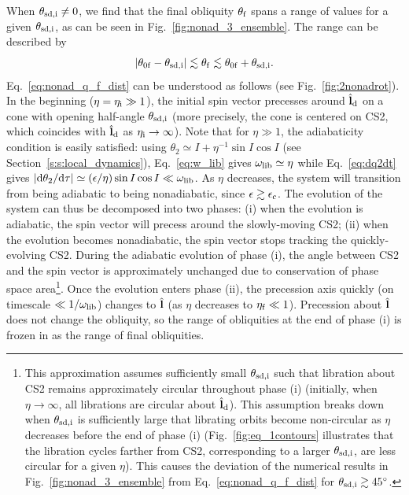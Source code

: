 When $\theta_{\rm sd, i}\neq 0$, we find that the final obliquity $\theta_{\rm
f}$ spans a range of values for a given $\theta_{\rm sd, i}$, as can be
seen in Fig.~\ref{fig:nonad_3_ensemble}. The range can be described by
\begin{equation}
    \abs{\theta_{\rm 0f} - \theta_{\rm sd, i}}
        \lesssim \theta_{\rm f}
        \lesssim \theta_{\rm 0f} + \theta_{\rm sd, i}
    .\label{eq:nonad_q_f_dist}
\end{equation}
Eq.~\eqref{eq:nonad_q_f_dist} can be understood as follows (see
Fig.~\ref{fig:2nonadrot}). In the beginning ($\eta = \eta_{\rm i} \gg 1$), the
initial spin vector precesses around $\hat{\boldsymbol{\mathbf{l}}}_{\rm d}$ on a cone with opening
half-angle $\theta_{\rm sd, i}$ (more precisely, the cone is centered on CS2,
which coincides with $\hat{\boldsymbol{\mathbf{l}}}_{\rm d}$ as $\eta_{\rm i} \to \infty$). Note that
for $\eta \gg 1$, the adiabaticity condition is easily satisfied: using
$\theta_2 \simeq I + \eta^{-1}\sin I \cos I$ (see
Section~\ref{s:s:local_dynamics}), Eq.~\eqref{eq:w_lib} gives $\omega_{\rm lib}
\simeq \eta$ while Eq.~\eqref{eq:dq2dt} gives $\left|\mathrm{d}\theta_2 / \mathrm{d}\tau\right|
\simeq \left(\epsilon / \eta\right) \sin I \cos I \ll \omega_{\rm lib}$. As $\eta$
decreases, the system will transition from being adiabatic to being
nonadiabatic, since $\epsilon \gtrsim \epsilon_{\rm c}$. The evolution of the
system can thus be decomposed into two phases: (i) when the evolution is
adiabatic, the spin vector will precess around the slowly-moving CS2; (ii) when
the evolution becomes nonadiabatic, the spin vector stops tracking the
quickly-evolving CS2. During the adiabatic evolution of phase (i), the angle
between CS2 and the spin vector is approximately unchanged due to conservation
of phase space area\footnote{ This approximation assumes sufficiently small
$\theta_{\rm sd, i}$ such that libration about CS2 remains approximately
circular throughout phase (i) (initially, when $\eta \to \infty$, all librations
are circular about $\hat{\boldsymbol{\mathbf{l}}}_{\rm d}$). This assumption breaks down when
$\theta_{\rm sd, i}$ is sufficiently large that librating orbits become
non-circular as $\eta$ decreases before the end of phase (i)
(Fig.~\ref{fig:eq_1contours} illustrates that the libration cycles farther from
CS2, corresponding to a larger $\theta_{\rm sd, i}$, are less circular for a
given $\eta$).
This causes the deviation of the numerical results in
Fig.~\ref{fig:nonad_3_ensemble} from Eq.~\eqref{eq:nonad_q_f_dist} for
$\theta_{\rm sd, i} \gtrsim 45^\circ$. }.
Once the evolution enters phase (ii), the precession axis
quickly (on timescale $\ll 1 / \omega_{\rm lib}$) changes to $\hat{\boldsymbol{\mathbf{l}}}$ (as $\eta$
decreases to $\eta_{\rm f} \ll 1$). Precession about $\hat{\boldsymbol{\mathbf{l}}}$ does not change the
obliquity, so the range of obliquities at the end of phase (i) is frozen in as
the range of final obliquities.

